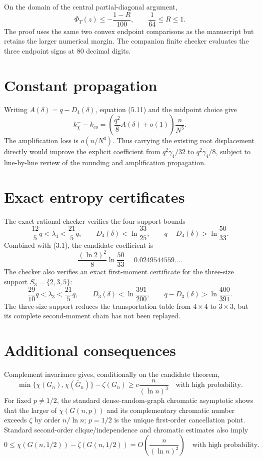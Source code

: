 \documentclass[11pt]{article}
\begin{document}
On the domain of the central partial-diagonal argument,
\[
 \boxed{\Phi_T(z)\le-\frac{1-R}{100}},
 \qquad \frac1{64}\le R\le1.
 \tag{2.1}
\]
The proof uses the same two convex endpoint comparisons as the manuscript but
retains the larger numerical margin.  The companion finite checker evaluates
the three endpoint signs at 80 decimal digits.

\section{Constant propagation}

Writing \(A(\delta)=q-D_4(\delta)\), equation (5.11) and the midpoint choice give
\[
 k_\chi^- -k_{co}
 =\left(\frac{q^2}{8}A(\delta)+o(1)\right)\frac{n}{N^3}.
 \tag{3.1}
\]
The amplification loss is \(o(n/N^3)\).  Thus carrying the existing root
displacement directly would improve the explicit coefficient from
\(q^2\gamma_4/32\) to \(q^2\gamma_4/8\), subject to line-by-line review of the
rounding and amplification propagation.

\section{Exact entropy certificates}

The exact rational checker verifies the four-support bounds
\[
 \frac{12}{5}q<\lambda_4<\frac{21}{5}q,
 \qquad
 D_4(\delta)<\ln\frac{33}{25},
 \qquad
 q-D_4(\delta)>\ln\frac{50}{33}.
 \tag{4.1}
\]
Combined with (3.1), the candidate coefficient is
\[
 \frac{(\ln2)^2}{8}\ln\frac{50}{33}
 =0.0249544559\ldots.
 \tag{4.2}
\]
The checker also verifies an exact first-moment certificate for the three-size
support \(S_3=\{2,3,5\}\):
\[
 \frac{29}{10}q<\lambda_3<\frac{21}{5}q,
 \qquad
 D_3(\delta)<\ln\frac{391}{200},
 \qquad
 q-D_3(\delta)>\ln\frac{400}{391}.
 \tag{4.3}
\]
The three-size support reduces the transportation table from \(4\times4\) to
\(3\times3\), but its complete second-moment chain has not been replayed.

\section{Additional consequences}

Complement invariance gives, conditionally on the candidate theorem,
\[
 \min\{\chi(G_n),\chi(\overline G_n)\}-\zeta(G_n)
 \ge c\frac{n}{(\ln n)^3}
 \quad\text{with high probability}.
 \tag{5.1}
\]
For fixed \(p\ne1/2\), the standard dense-random-graph chromatic asymptotic
shows that the larger of \(\chi(G(n,p))\) and its complementary chromatic
number exceeds \(\zeta\) by order \(n/\ln n\); \(p=1/2\) is the unique
first-order cancellation point.  Standard second-order clique/independence and
chromatic estimates also imply
\[
 0\le\chi(G(n,1/2))-\zeta(G(n,1/2))
 =O\!\left(\frac{n}{(\ln n)^2}\right)
 \quad\text{with high probability}.
 \tag{5.2}
\]
\end{document}
